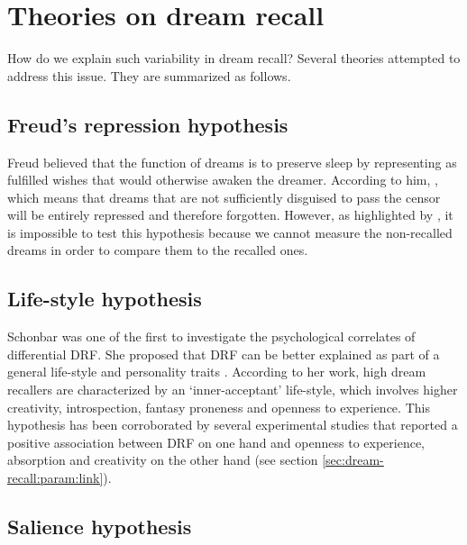 \section{Theories on dream recall}
\label{sec:dream-recall:theories}

How do we explain such variability in dream recall? Several theories attempted to address this issue. They are summarized as follows.

\subsection{Freud’s repression hypothesis}
\label{sec:dream-recall:theories:freud}

Freud believed that the function of dreams is to preserve sleep by representing as fulfilled wishes that would otherwise awaken the dreamer. According to him,  \citep{freud_interpretation_1900}, which means that dreams that are not sufficiently disguised to pass the censor will be entirely repressed and therefore forgotten. However, as highlighted by \citet{schredl_dream_1999}, it is impossible to test this hypothesis because we cannot measure the non-recalled dreams in order to compare them to the recalled ones.

\subsection{Life-style hypothesis}
\label{sec:dream-recall:theories:life-style}

Schonbar was one of the first to investigate the psychological correlates of differential DRF. She proposed that DRF can be better explained as part of a general life-style and personality traits \citep{schonbar_differential_1965}. According to her work, high dream recallers are characterized by an ‘inner-acceptant’ life-style, which involves higher creativity, introspection, fantasy proneness and openness to experience. This hypothesis has been corroborated by several experimental studies that reported a positive association between DRF on one hand and openness to experience, absorption and creativity on the other hand (see section \ref{sec:dream-recall:param:link}).

\subsection{Salience hypothesis}
\label{sec:dream-recall:theories:salience}

